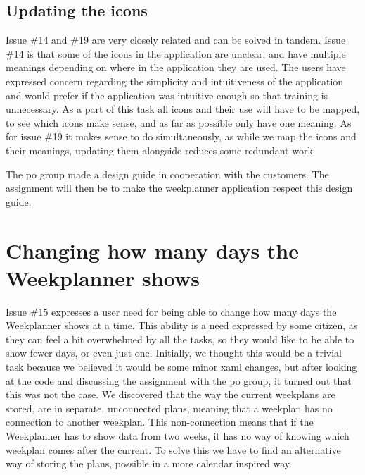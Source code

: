 \subsection{Updating the icons}
Issue \#14 and \#19 are very closely related and can be solved in tandem. Issue \#14 is that some of the icons in the application are unclear, and have multiple meanings depending on where in the application they are used. The users have expressed concern regarding the simplicity and intuitiveness of the application and would prefer if the application was intuitive enough so that training is unnecessary.
As a part of this task all icons and their use will have to be mapped, to see which icons make sense, and as far as possible only have one meaning. As for issue \#19 it makes sense to do simultaneously, as while we map the icons and their meanings, updating them alongside reduces some redundant work. 

The \gls{po} group made a design guide in cooperation with the customers. The assignment will then be to make the weekplanner application respect this design guide.

\section{Changing how many days the Weekplanner shows}\label{sec:weekPlannerDaysToShow}

Issue \#15 expresses a user need for being able to change how many days the Weekplanner shows at a time. This ability is a need expressed by some citizen, as they can feel a bit overwhelmed by all the tasks, so they would like to be able to show fewer days, or even just one.
Initially, we thought this would be a trivial task because we believed it would be some minor \gls{xaml} changes, but after looking at the code and discussing the assignment with the \gls{po} group, it turned out that this was not the case. We discovered that the way the current weekplans are stored, are in separate, unconnected plans, meaning that a weekplan has no connection to another weekplan. This non-connection means that if the Weekplanner has to show data from two weeks, it has no way of knowing which weekplan comes after the current.
To solve this we have to find an alternative way of storing the plans, possible in a more calendar inspired way.

